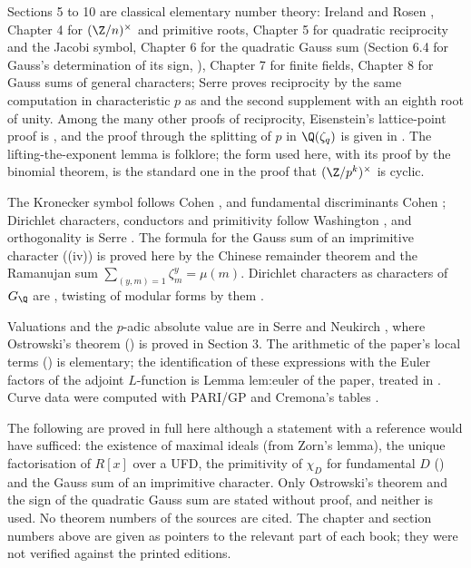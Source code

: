 Sections 5 to 10 are classical elementary number theory: Ireland and Rosen \cite{IrelandRosen}, Chapter 4 for $(\Z/n)^\times$ and primitive
roots, Chapter 5 for quadratic reciprocity and the Jacobi symbol, Chapter 6 for the quadratic Gauss sum (Section 6.4 for Gauss's
determination of its sign, ), Chapter 7 for finite fields, Chapter 8 for Gauss sums of general characters;
Serre \cite[Chapter I]{SerreCourse} proves reciprocity by the same computation in characteristic $p$ as  and the second
supplement with an eighth root of unity. Among the many other proofs of reciprocity, Eisenstein's lattice-point proof is
, and the proof through the splitting of $p$ in $\Q(\zeta_q)$ is given in . The lifting-the-exponent
lemma is folklore; the form used here, with its proof by the binomial theorem, is the standard one in the proof that $(\Z/p^k)^\times$
is cyclic.

The Kronecker symbol follows Cohen \cite[Section 1.4]{Cohen93}, and fundamental discriminants Cohen \cite[Section 5.1]{Cohen93}; Dirichlet characters, conductors and
primitivity follow Washington \cite[Chapter 3]{Washington}, and orthogonality is Serre \cite[Chapter VI, Section 1]{SerreCourse}. The formula
for the Gauss sum of an imprimitive character ((iv)) is proved here by the Chinese remainder theorem and the
Ramanujan sum $\sum_{(y,m)=1}\zeta_m^y=\mu(m)$. Dirichlet characters as characters of $G_\Q$ are , twisting of modular forms by them
.

Valuations and the $p$-adic absolute value are in Serre \cite[Chapter II]{SerreCourse} and Neukirch \cite[Chapter II]{Neukirch}, where
Ostrowski's theorem () is proved in Section 3. The arithmetic of the paper's local terms
() is elementary; the identification of these expressions with the
Euler factors of the adjoint $L$-function is Lemma lem:euler of the paper, treated in . Curve data were computed
with PARI/GP \cite{PARI} and Cremona's tables \cite{Cremona97}.

The following are proved in full here although a statement with a reference would have sufficed: the existence of
maximal ideals (from Zorn's lemma), the unique factorisation of $R[x]$ over a UFD, the primitivity of $\chi_D$ for fundamental $D$
() and the Gauss sum of an imprimitive character. Only Ostrowski's theorem and the sign of the
quadratic Gauss sum are stated without proof, and neither is used. No theorem numbers of the sources are cited. The chapter and section numbers above are given as pointers to the relevant part of
each book; they were not verified against the printed editions.
